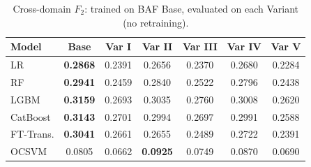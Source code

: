 \begin{table}[ht!]
\centering
\caption{Cross-domain $F_2$: trained on BAF Base, evaluated on each Variant (no retraining).}
\label{tab:crossdomain_f2}
\begin{tabular}{l c c c c c c}
\toprule
Model & Base & Var I & Var II & Var III & Var IV & Var V \\
\midrule
LR         & \textbf{0.2868} & 0.2391 & 0.2656 & 0.2370 & 0.2680 & 0.2284 \\
RF         & \textbf{0.2941} & 0.2459 & 0.2840 & 0.2522 & 0.2796 & 0.2438 \\
LGBM       & \textbf{0.3159} & 0.2693 & 0.3035 & 0.2760 & 0.3008 & 0.2620 \\
CatBoost   & \textbf{0.3143} & 0.2701 & 0.2994 & 0.2697 & 0.2991 & 0.2588 \\
FT-Trans.  & \textbf{0.3041} & 0.2661 & 0.2655 & 0.2489 & 0.2722 & 0.2391 \\
OCSVM      & 0.0805 & 0.0662 & \textbf{0.0925} & 0.0749 & 0.0870 & 0.0690 \\
\bottomrule
\end{tabular}
\end{table}
